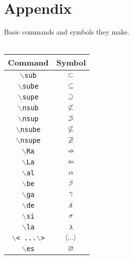 \documentclass[10pt]{article}
\begin{document}
\section*{Appendix} 
Basic commands and symbols they make.\\\\
\begin{tabular}{|c|c|}
\hline
Command & Symbol \\
\hline
\texttt{$\backslash $sub} & $\subset$ \\
\hline
\texttt{$\backslash $sube} & $\subseteq$ \\
\hline
\texttt{$\backslash $supe} & $\supseteq$ \\
\hline
\texttt{$\backslash $nsub} & $\nsub$ \\
\hline
\texttt{$\backslash $nsup} & $\nsup$ \\
\hline
\texttt{$\backslash $nsube} & $\nsube$ \\
\hline
\texttt{$\backslash $nsupe} & $\nsupe$ \\
\hline
\texttt{$\backslash $Ra} & $\Rightarrow$ \\
\hline
\texttt{$\backslash $La} & $\Leftarrow$ \\
\hline
\texttt{$\backslash $al} & $\alpha$ \\
\hline
\texttt{$\backslash $be} & $\beta$ \\
\hline
\texttt{$\backslash $ga} & $\gamma$ \\
\hline
\texttt{$\backslash $de} & $\delta$ \\
\hline
\texttt{$\backslash $si} & $\sigma$ \\
\hline
\texttt{$\backslash $la} & $\lambda$ \\
\hline
\texttt{$\backslash $< ...$\backslash $>} & $\left\langle...\right\rangle$ \\
\hline
\texttt{$\backslash$es} & $\varnothing$ \\
\hline
\end{tabular}
\hindex
\end{document}

